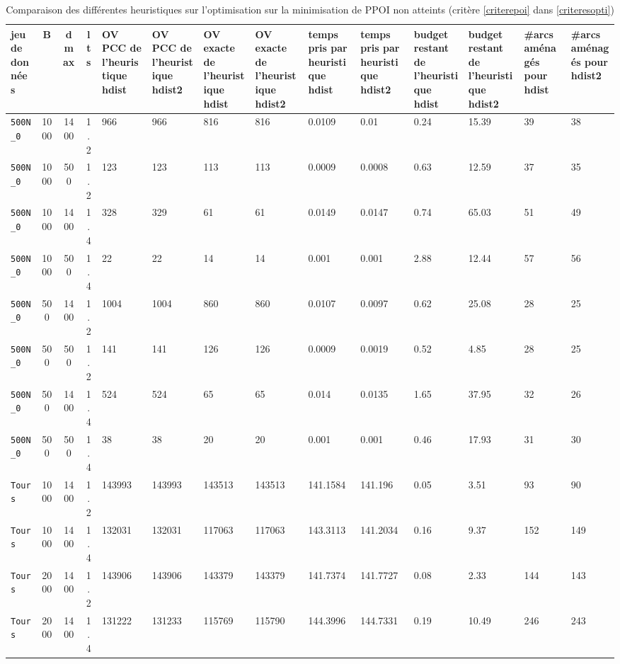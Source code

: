 \begin{sidewaystable}
    \centering
    \caption{Comparaison des différentes heuristiques sur l'optimisation sur la minimisation de PPOI non atteints (critère \ref{criterepoi} dans \ref{criteresopti})}
    \label{tab:hdist2500}
    \begin{tabular}{|p{1.5cm}|c|c|c|p{1.5cm}|p{1.5cm}|p{1.5cm}|p{1.5cm}|p{2cm}|p{2cm}|p{1.5cm}|p{1.5cm}|p{1cm}|p{1cm}|}
    \hline
    jeu de données & B & dmax & lts & OV PCC de
    l'heuristique hdist & OV PCC de
    l'heuristique hdist2 & OV exacte de
    l'heuristique hdist & OV exacte de
    l'heuristique hdist2 & temps pris par
    heuristique hdist & temps pris par
    heuristique hdist2 & budget restant
    de l'heuristique hdist & budget restant
    de l'heuristique hdist2 & \#arcs aménagés pour hdist & \#arcs aménagés pour hdist2 \\
    \hline
    \verb|500N_0| & 1000 & 1400 & 1.2 & 966 & 966 & 816 & 816 & 0.0109 & 0.01 & 0.24 & 15.39 & 39 & 38 \\
    \verb|500N_0| & 1000 & 500 & 1.2 & 123 & 123 & 113 & 113 & 0.0009 & 0.0008 & 0.63 & 12.59 & 37 & 35 \\
    \verb|500N_0| & 1000 & 1400 & 1.4 & 328 & 329 & 61 & 61 & 0.0149 & 0.0147 & 0.74 & 65.03 & 51 & 49 \\
    \verb|500N_0| & 1000 & 500 & 1.4 & 22 & 22 & 14 & 14 & 0.001 & 0.001 & 2.88 & 12.44 & 57 & 56 \\
    \verb|500N_0| & 500 & 1400 & 1.2 & 1004 & 1004 & 860 & 860 & 0.0107 & 0.0097 & 0.62 & 25.08 & 28 & 25 \\
    \verb|500N_0| & 500 & 500 & 1.2 & 141 & 141 & 126 & 126 & 0.0009 & 0.0019 & 0.52 & 4.85 & 28 & 25 \\
    \verb|500N_0| & 500 & 1400 & 1.4 & 524 & 524 & 65 & 65 & 0.014 & 0.0135 & 1.65 & 37.95 & 32 & 26 \\
    \verb|500N_0| & 500 & 500 & 1.4 & 38 & 38 & 20 & 20 & 0.001 & 0.001 & 0.46 & 17.93 & 31 & 30 \\
    \verb|Tours| & 1000 & 1400 & 1.2 & 143993 & 143993 & 143513 & 143513 & 141.1584 & 141.196 & 0.05 & 3.51 & 93 & 90 \\
    \verb|Tours| & 1000 & 1400 & 1.4 & 132031 & 132031 & 117063 & 117063 & 143.3113 & 141.2034 & 0.16 & 9.37 & 152 & 149 \\
    \verb|Tours| & 2000 & 1400 & 1.2 & 143906 & 143906 & 143379 & 143379 & 141.7374 & 141.7727 & 0.08 & 2.33 & 144 & 143 \\
    \verb|Tours| & 2000 & 1400 & 1.4 & 131222 & 131233 & 115769 & 115790 & 144.3996 & 144.7331 & 0.19 & 10.49 & 246 & 243 \\
    \hline
    \end{tabular}


\end{sidewaystable}
